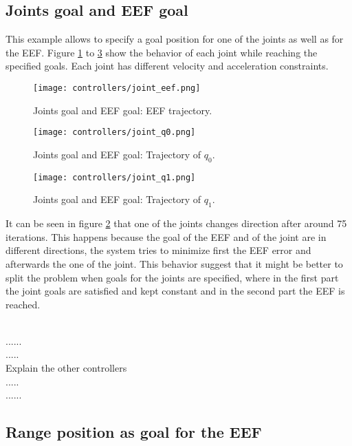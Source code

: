 \subsection{Joints goal and EEF goal}
This example allows to specify a goal position for one of the joints as well as for the EEF. Figure \ref{fig:joint_eef} to \ref{fig:joint_1} show the behavior of each joint while reaching the specified goals. Each joint has different velocity and acceleration constraints.
\begin{figure}[H]
	\centering
	\texttt{[image: controllers/joint\_eef.png]}
	\vspace{-10pt}
	\caption{Joints goal and EEF goal: EEF trajectory.}
	\vspace{-15pt}
	\label{fig:joint_eef}
\end{figure}
\begin{figure}[H]
	\centering
	\texttt{[image: controllers/joint\_q0.png]}
	\vspace{-10pt}
	\caption{Joints goal and EEF goal: Trajectory of $q_{0}$.}
	\vspace{-15pt}
	\label{fig:joint_0}
\end{figure}
\begin{figure}[H]
	\centering
	\texttt{[image: controllers/joint\_q1.png]}
	\vspace{-10pt}
	\caption{Joints goal and EEF goal: Trajectory of $q_{1}$.}
	\vspace{-15pt}
	\label{fig:joint_1}
\end{figure}
It can be seen in figure \ref{fig:joint_0} that one of the joints changes direction after around 75 iterations. This happens because the goal of the EEF and of the joint are in different directions, the system tries to minimize first the EEF error and afterwards the one of the joint. This behavior suggest  that it might be better to split the problem when goals for the joints are specified, where in the first part the joint goals are satisfied and kept constant and in the second part the EEF is reached.

\\......\\
.....\\
Explain the other controllers\\
.....\\
......\\
\subsection{Range position as goal for the EEF}
